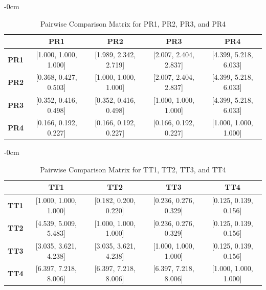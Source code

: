 \documentclass[journal,article,submit,pdftex,moreauthors]{Definitions/mdpi}
\begin{document}
\begin{table}[h!]
\begin{adjustwidth}{-\extralength}{0cm}
    \centering
    \begin{tabular}{c|c|c|c|c}
    \hline
    & \textbf{PR1} & \textbf{PR2} & \textbf{PR3} & \textbf{PR4} \\
    \hline
    \textbf{PR1} & [1.000, 1.000, 1.000] & [1.989, 2.342, 2.719] & [2.007, 2.404, 2.837] & [4.399, 5.218, 6.033] \\
    \hline
    \textbf{PR2} & [0.368, 0.427, 0.503] & [1.000, 1.000, 1.000] & [2.007, 2.404, 2.837] & [4.399, 5.218, 6.033] \\
    \hline
    \textbf{PR3} & [0.352, 0.416, 0.498] & [0.352, 0.416, 0.498] & [1.000, 1.000, 1.000] & [4.399, 5.218, 6.033] \\
    \hline
    \textbf{PR4} & [0.166, 0.192, 0.227] & [0.166, 0.192, 0.227] & [0.166, 0.192, 0.227] & [1.000, 1.000, 1.000] \\
    \hline
    \end{tabular}
    \caption{Pairwise Comparison Matrix for PR1, PR2, PR3, and PR4}
    \label{tab:pr-matrix}
\end{adjustwidth}
\end{table}


\begin{table}[h!]
\begin{adjustwidth}{-\extralength}{0cm}
    \centering
    \begin{tabular}{c|c|c|c|c}
    \hline
    & \textbf{TT1} & \textbf{TT2} & \textbf{TT3} & \textbf{TT4} \\
    \hline
    \textbf{TT1} & [1.000, 1.000, 1.000] & [0.182, 0.200, 0.220] & [0.236, 0.276, 0.329] & [0.125, 0.139, 0.156] \\
    \hline
    \textbf{TT2} & [4.539, 5.009, 5.483] & [1.000, 1.000, 1.000] & [0.236, 0.276, 0.329] & [0.125, 0.139, 0.156] \\
    \hline
    \textbf{TT3} & [3.035, 3.621, 4.238] & [3.035, 3.621, 4.238] & [1.000, 1.000, 1.000] & [0.125, 0.139, 0.156] \\
    \hline
    \textbf{TT4} & [6.397, 7.218, 8.006] & [6.397, 7.218, 8.006] & [6.397, 7.218, 8.006] & [1.000, 1.000, 1.000] \\
    \hline
    \end{tabular}
    \caption{Pairwise Comparison Matrix for TT1, TT2, TT3, and TT4}
    \label{tab:tt-matrix}
\end{adjustwidth}
\end{table}
\end{document}
